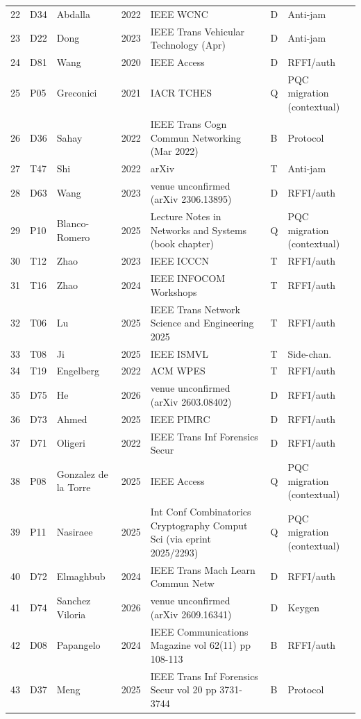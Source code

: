 \begin{table}[p]
\begin{tabular}{@{}lllll>{\raggedright\arraybackslash}p{3.3cm}>{\raggedright\arraybackslash}p{1.9cm}@{}}
22 & D34 & Abdalla & 2022 & IEEE WCNC & D & Anti-jam \\
23 & D22 & Dong & 2023 & IEEE Trans Vehicular Technology (Apr) & D & Anti-jam \\
24 & D81 & Wang & 2020 & IEEE Access & D & RFFI/auth \\
25 & P05 & Greconici & 2021 & IACR TCHES & Q & PQC migration (contextual) \\
26 & D36 & Sahay & 2022 & IEEE Trans Cogn Commun Networking (Mar 2022) & B & Protocol \\
27 & T47 & Shi & 2022 & arXiv & T & Anti-jam \\
28 & D63 & Wang & 2023 & venue unconfirmed (arXiv 2306.13895) & D & RFFI/auth \\
29 & P10 & Blanco-Romero & 2025 & Lecture Notes in Networks and Systems (book chapter) & Q & PQC migration (contextual) \\
30 & T12 & Zhao & 2023 & IEEE ICCCN & T & RFFI/auth \\
31 & T16 & Zhao & 2024 & IEEE INFOCOM Workshops & T & RFFI/auth \\
32 & T06 & Lu & 2025 & IEEE Trans Network Science and Engineering 2025 & T & RFFI/auth \\
33 & T08 & Ji & 2025 & IEEE ISMVL & T & Side-chan. \\
34 & T19 & Engelberg & 2022 & ACM WPES & T & RFFI/auth \\
35 & D75 & He & 2026 & venue unconfirmed (arXiv 2603.08402) & D & RFFI/auth \\
36 & D73 & Ahmed & 2025 & IEEE PIMRC & D & RFFI/auth \\
37 & D71 & Oligeri & 2022 & IEEE Trans Inf Forensics Secur & D & RFFI/auth \\
38 & P08 & Gonzalez de la Torre & 2025 & IEEE Access & Q & PQC migration (contextual) \\
39 & P11 & Nasiraee & 2025 & Int Conf Combinatorics Cryptography Comput Sci (via eprint 2025/2293) & Q & PQC migration (contextual) \\
40 & D72 & Elmaghbub & 2024 & IEEE Trans Mach Learn Commun Netw & D & RFFI/auth \\
41 & D74 & Sanchez Viloria & 2026 & venue unconfirmed (arXiv 2609.16341) & D & Keygen \\
42 & D08 & Papangelo & 2024 & IEEE Communications Magazine vol 62(11) pp 108-113 & B & RFFI/auth \\
43 & D37 & Meng & 2025 & IEEE Trans Inf Forensics Secur vol 20 pp 3731-3744 & B & Protocol \\

\end{tabular}
\end{table}
